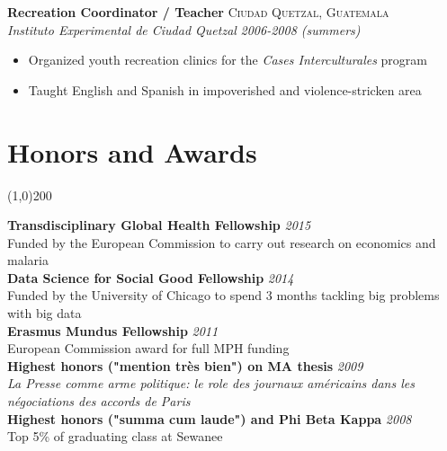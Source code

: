 \documentclass[11pt]{article}
\begin{document}
\noindent \textbf{Recreation Coordinator / Teacher} \hfill \textsc{Ciudad Quetzal, Guatemala}\\
\noindent \emph{Instituto Experimental de Ciudad Quetzal} \hfill \emph{2006-2008 (summers)}
\vspace{-2mm}
\begin{itemize}\itemsep0pt \parskip0pt 
\item Organized youth recreation clinics for the \textit{Cases Interculturales} program
\item Taught English and Spanish in impoverished and violence-stricken area
\end{itemize}



\section*{Honors and Awards} %
\vspace{-7mm}
\line(1,0){200}
\vspace{2mm}

\noindent \textbf{Transdisciplinary Global Health Fellowship} \hfill \emph{2015}\\
\noindent Funded by the European Commission to carry out research on economics and malaria \\


\noindent \textbf{Data Science for Social Good Fellowship} \hfill \emph{2014}\\
\noindent Funded by the University of Chicago to spend 3 months tackling big problems with big data \\

\noindent \textbf{Erasmus Mundus Fellowship} \hfill \emph{2011}\\
\noindent European Commission award for full MPH funding \\

\noindent \textbf{Highest honors ("mention très bien") on MA thesis} \hfill \emph{2009}\\
\noindent \textit{La Presse comme arme politique: le role des journaux américains dans les négociations des accords de Paris}\\

\noindent \textbf{Highest honors ("summa cum laude") and Phi Beta Kappa}  \hfill \emph{2008}\\
\noindent Top 5\% of graduating class at Sewanee  \\
\end{document}
